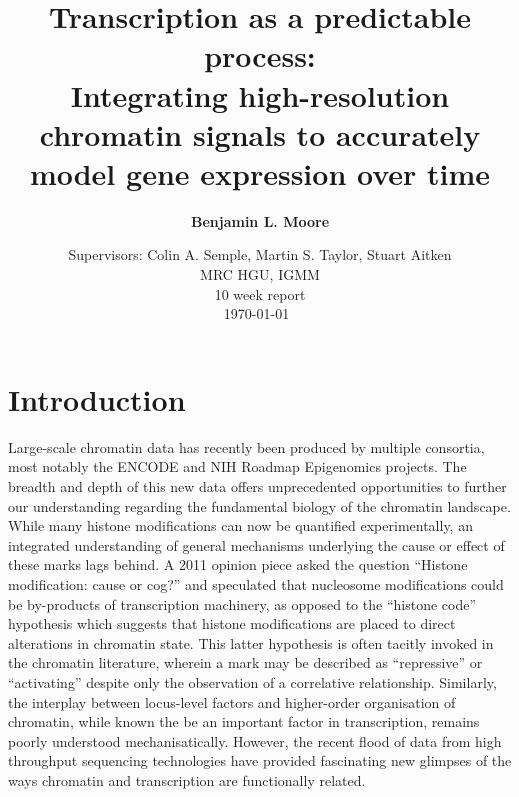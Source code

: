\documentclass[a4paper]{report}
\title{ \vspace{1in} Transcription as a predictable process: \\ Integrating high-resolution chromatin signals to accurately model gene expression
over time}
\author{\bf Benjamin L. Moore }
\date{Supervisors: Colin A. Semple, Martin S. Taylor, Stuart Aitken \\ \vspace{20pt}
  \normalsize{MRC HGU, IGMM}
\\\normalsize{10 week report} \\ \today~ \\ \vspace{0in}}
\begin{document}
\doublespacing
\maketitle

\chapter*{Introduction}
Large-scale chromatin data has recently been produced by multiple
consortia, most notably the ENCODE\cite{Gerstein2012} and NIH
Roadmap Epigenomics\cite{Bernstein2010} projects. The breadth and depth of this new
data offers unprecedented opportunities to further our understanding
regarding the fundamental biology of the chromatin landscape. While many histone
modifications can now be quantified experimentally,\cite{Nikolov2012, Sajan2012, Ernst2011} an integrated
understanding of general mechanisms underlying the cause or effect of
these marks lags behind. A 2011 opinion piece asked
the question ``Histone modification: cause or
cog?''\cite{Henikoff2011} and speculated that nucleosome modifications
could be by-products of transcription machinery, as opposed to
the ``histone code'' hypothesis which suggests that histone
modifications are placed to direct alterations in chromatin
state. This latter hypothesis is often tacitly invoked in the
chromatin literature, wherein a mark may be described as
``repressive'' or ``activating'' despite only the observation of a
correlative relationship.\cite{Henikoff2011} Similarly, the interplay
between locus-level factors and higher-order organisation of
chromatin, while known the be an important factor in
transcription, remains poorly understood mechanisatically.\cite{Li2011} 
However, the recent flood of data from high throughput sequencing technologies have provided fascinating new glimpses of the ways chromatin and transcription are functionally related.\\
\end{document}

